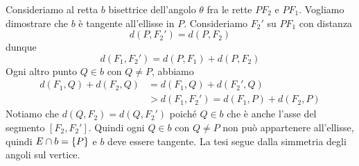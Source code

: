 \documentclass[a4paper]{article}
\begin{document}
\begin{snippetproof}{}

    \begin{figure}
        \begin{center}
        \end{center}
    \end{figure}
    Consideriamo al retta \(b\) bisettrice dell'angolo \(\theta\) fra le rette
    \(PF_2\) e \(PF_1\). Vogliamo dimostrare che \(b\) è tangente all'ellisse in \(P\).
    Consideriamo \(F_2'\) su \(PF_1\) con distanza
    \[
        d(P, F_2') = d(P, F_2)
    \]
    dunque
    \[
        d(F_1, F_2') = d(P, F_1) + d(P, F_2)
    \]
    Ogni altro punto \(Q \in b\) con \(Q \neq P\),
    abbiamo \begin{align*}
        d(F_1, Q) + d(F_2, Q)
        &= d(F_1, Q) + d(F_2', Q) \\
        &> d(F_1, F_2') = d(F_1, P) + d(F_2, P)
    \end{align*}
    Notiamo che \(d(Q, F_2) = d(Q, F_2')\) poiché
    \(Q \in b\) che è anche l'asse del segmento \([F_2, F_2']\).
    Quindi ogni \(Q \in b\) con \(Q \neq P\) non può appartenere all'ellisse,
    quindi \(E \cap b = \{P\}\) e \(b\) deve essere tangente. La tesi segue dalla simmetria
    degli angoli sul vertice.
    \wrapfill
\end{snippetproof}
\end{document}
